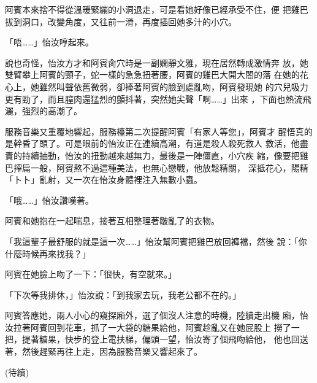 阿賓本來捨不得從溫暖緊繃的小洞退走，可是看她好像已經承受不住，便
把雞巴拔到洞口，改變角度，又往前一滑，再度插回她多汁的小穴。

「唔……」怡汝哼起來。

說也奇怪，怡汝方才和阿賓肏穴時是一副嫻靜文雅，現在居然轉成激情奔
放，她雙臂攀上阿賓的頸子，蛇一樣的急急扭著腰，阿賓的雞巴大開大閤的落
在她的花心上，她雖然叫聲依舊微弱，卻捧著阿賓的臉到處亂吻，阿賓發現她
的穴兒吸力更有勁了，而且膣肉還猛烈的顫抖著，突然她尖聲「啊……」出來
，下面也熱流飛灑，強烈的高潮了。

服務音樂又重覆地響起，服務檯第二次提醒阿賓「有家人等您」，阿賓才
醒悟真的是幹昏了頭了。可是眼前的怡汝正在連續高潮，有道是殺人殺死救人
救活，他盡責的持續抽動，怡汝的扭動越來越無力，最後是一陣僵直，小穴疾
縮，像要把雞巴搾扁一般，阿賓熬不過這種美法，也無心戀戰，他放鬆精關，
深抵花心，陽精「卜卜」亂射，又一次在怡汝身體裡注入無數小蟲。

「哦……」怡汝讚嘆著。

阿賓和她抱在一起喘息，接著互相整理著皺亂了的衣物。

「我這輩子最舒服的就是這一次……」怡汝幫阿賓把雞巴放回褲襠，然後
說：「你什麼時候再來找我？」

阿賓在她臉上吻了一下：「很快，有空就來。」

「下次等我排休，」怡汝說：「到我家去玩，我老公都不在的。」

阿賓答應她，兩人小心的窺探廂外，選了個沒人注意的時機，陸續走出機
廂，怡汝拉著阿賓回到花車，抓了一大袋的糖果給他，阿賓趁亂又在她屁股上
撈了一把，提著糖果，快步的登上電扶梯，偏頭一望，怡汝寄了個飛吻給他，
他也回送著，然後趕緊再往上走，因為服務音樂又響起來了。

(待續)










